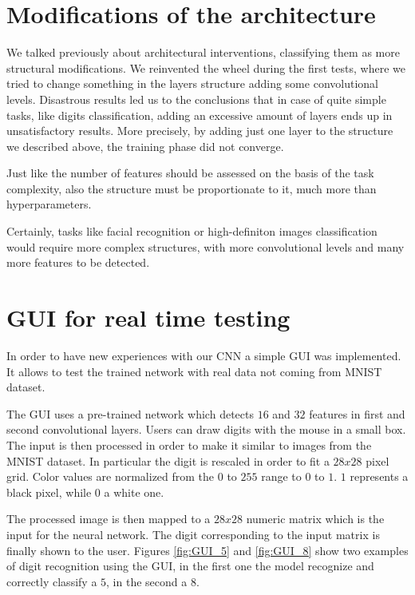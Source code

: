 \section{Modifications of the architecture}

We talked previously about architectural interventions, classifying them as more structural modifications. We reinvented the wheel during the first tests, where we tried to change something in the layers structure adding some convolutional levels. Disastrous results led us to the conclusions that in case of quite simple tasks, like digits classification, adding an excessive amount of layers ends up in unsatisfactory results. More precisely, by adding just one layer to the structure we described above, the training phase did not converge. 

Just like the number of features should be assessed on the basis of the task complexity, also the structure must be proportionate to it, much more than hyperparameters.

Certainly, tasks like facial recognition or high-definiton images classification would require more complex structures, with more convolutional levels and many more features to be detected.

\section{GUI for real time testing}

In order to have new experiences with our \acs{CNN} a simple \acs{GUI} was implemented. It allows to test the trained network with real data not coming from \acs{MNIST} dataset.

The \acs{GUI} uses a pre-trained network which detects $16$ and $32$ features in first and second convolutional layers. Users can draw digits with the mouse in a small box. The input is then processed in order to make it similar to images from the \acs{MNIST} dataset. In particular the digit is rescaled in order to fit a $28x28$ pixel grid. Color values are normalized from the $0$ to $255$ range to $0$ to $1$. $1$ represents a black pixel, while $0$ a white one.

The processed image is then mapped to a $28x28$ numeric matrix which is the input for the neural network. The digit corresponding to the input matrix is finally shown to the user. Figures \ref{fig:GUI_5} and \ref{fig:GUI_8} show two examples of digit recognition using the \acs{GUI}, in the first one the model recognize and correctly classify a $5$, in the second a $8$.

